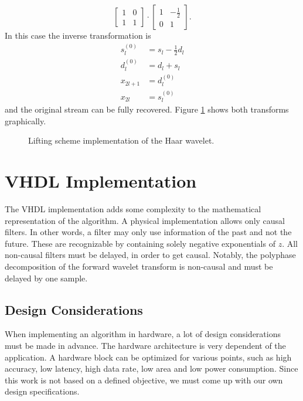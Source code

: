 \begin{refsection}
\begin{equation*}
\begin{bmatrix}
		1 & 0 \\
		1 & 1
	\end{bmatrix}
	\cdot
	\begin{bmatrix}
		1 & -\frac{1}{2} \\
		0 & 1
	\end{bmatrix}
	.
\end{equation*}
In this case the inverse transformation is 
\begin{align}\label{fpga:equation:inv_haar}
	s_l^{(0)} &= s_l - \frac{1}{2}d_l \\
	d_l^{(0)} &= d_l + s_l \\ 
	x_{2l+1}& =d_l^{(0)} \\
	x_{2l} &= s_l^{(0)}
\end{align}
and the original stream can be fully recovered.
Figure \ref{fpga:fig:liftingStepHaar} shows both transforms graphically.
\begin{figure}
	\centering
	
	\caption{Lifting scheme implementation of the Haar wavelet.}
	\label{fpga:fig:liftingStepHaar}
\end{figure}

\section{VHDL Implementation}

The VHDL implementation adds some complexity to the mathematical representation of the algorithm.
A physical implementation allows only causal filters.
In other words, a filter may only use information of the past and not the future.
These are recognizable by containing solely negative exponentials of $z$.
All non-causal filters must be delayed, in order to get causal.
Notably, the polyphase decomposition of the forward wavelet transform is non-causal and must be delayed by one sample.

\subsection{Design Considerations}

When implementing an algorithm in hardware, a lot of design considerations must be made in advance.
The hardware architecture is very dependent of the application.
A hardware block can be optimized for various points, such as high accuracy, low latency, high data rate, low area and low power consumption.
Since this work is not based on a defined objective, we must come up with our own design specifications.


\end{refsection}
